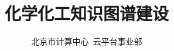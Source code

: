 
\title{化学化工知识图谱建设}
\author[ ]{北京市计算中心~云平台事业部}   %
\renewcommand*{\Authfont}{\small\rm} %
\renewcommand*{\Affilfont}{\small\it} %
\renewcommand\Authands{ and } %
\renewcommand\Authands{ , } %
\date{} %


\maketitle
